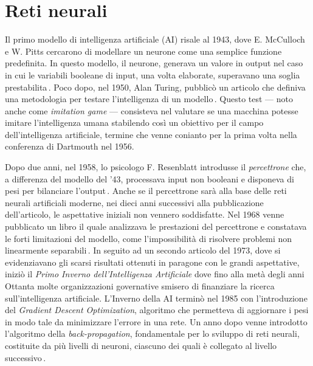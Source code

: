 
\chapter{Reti neurali}\label{chp:neural-networks}
% 
Il primo modello di intelligenza artificiale (\acs{AI}) risale al 1943, dove E. McCulloch e W. Pitts cercarono di modellare un neurone come una semplice funzione predefinita. In questo modello, il neurone, generava un valore in output nel caso in cui le variabili booleane di input, una volta elaborate, superavano una soglia prestabilita\,\cite{mcculloch1943logical}. Poco dopo, nel 1950, Alan Turing, pubblicò un articolo che definiva una metodologia per testare l'intelligenza di un modello\,\cite{turing2009computing}. Questo test — noto anche come \textit{imitation game} — consisteva nel valutare se una macchina potesse imitare l'intelligenza umana stabilendo così un obiettivo per il campo dell'intelligenza artificiale, termine che venne conianto per la prima volta nella conferenza di Dartmouth nel 1956.

Dopo due anni, nel 1958, lo psicologo F. Resenblatt introdusse il \textsl{percettrone} che, a differenza del modello del '43, processava input non booleani e disponeva di pesi per bilanciare l'output\,\cite{rosenblatt1958perceptron}. Anche se il percettrone sarà alla base delle reti neurali artificiali moderne, nei dieci anni successivi alla pubblicazione dell'articolo, le aspettative iniziali non vennero soddisfatte. Nel 1968 venne pubblicato un libro il quale analizzava le prestazioni del percettrone e constatava le forti limitazioni del modello, come l'impossibilità di risolvere problemi non linearmente separabili\,\cite{minsky2017perceptrons}. In seguito ad un secondo articolo del 1973, dove si evidenziavano gli scarsi risultati ottenuti in paragone con le grandi aspettative, iniziò il \textsl{Primo Inverno dell'Intelligenza Artificiale} dove fino alla metà degli anni Ottanta molte organizzazioni governative smisero di finanziare la ricerca sull'intelligenza artificiale. L'Inverno della \acs{AI} terminò nel 1985 con l'introduzione del \textit{Gradient Descent Optimization}, algoritmo che permetteva di aggiornare i pesi in modo tale da minimizzare l'errore in una rete. Un anno dopo venne introdotto l'algoritmo della \textit{back-propagation}, fondamentale per lo sviluppo di reti neurali, costituite da più livelli di neuroni, ciascuno dei quali è collegato al livello successivo\,\cite{rumelhart1986learning}.


